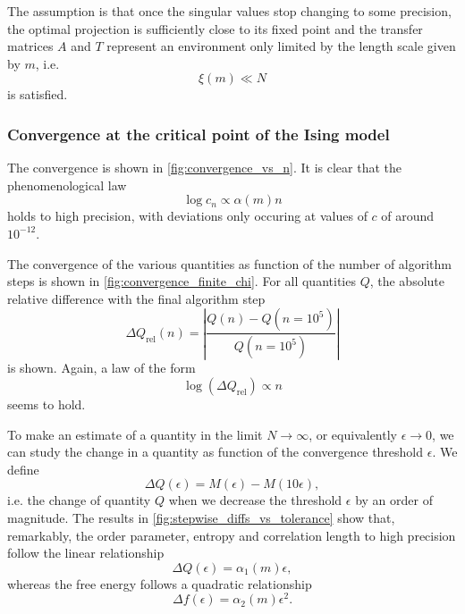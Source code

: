 The assumption is that once the singular values stop changing to some precision, the optimal projection is sufficiently
close to its fixed point and the transfer matrices $A$ and $T$ represent an environment only limited by the length scale
given by $m$, i.e.
\begin{equation}
  \xi(m) \ll N
\end{equation}
is satisfied.

\subsubsection{Convergence at the critical point of the Ising model}
The convergence is shown in \autoref{fig:convergence_vs_n}. It is clear that the
phenomenological law
\begin{equation}
  \log c_n \propto \alpha(m) n
\end{equation}
holds to high precision, with deviations only occuring at values of $c$ of around $10^{-12}$.

The convergence of the various quantities as function of the number of algorithm steps is shown in
\autoref{fig:convergence_finite_chi}. For all quantities $Q$, the absolute relative difference
with the final algorithm step
\begin{equation}\label{eq:abs_rel_diff}
  \Delta Q_{\text{rel}}(n) = \left| \frac{Q(n) - Q(n = 10^5)}{Q(n = 10^5)} \right|
\end{equation}
is shown. Again, a law of the form
\begin{equation}
  \log(\Delta Q_{\text{rel}}) \propto n
\end{equation}
seems to hold.

To make an estimate of a quantity in the limit $N \to \infty$, or equivalently $\epsilon \to 0$,
we can study the change in a quantity as function of the convergence threshold $\epsilon$. We define
\begin{equation}\label{eq:stepwise_difference_epsilon}
  \Delta Q(\epsilon) = M(\epsilon) - M(10\epsilon),
\end{equation}
i.e. the change of quantity $Q$ when we decrease the threshold $\epsilon$ by an order of magnitude. The results in
\autoref{fig:stepwise_diffs_vs_tolerance} show that, remarkably, the order parameter, entropy and correlation length
to high precision follow the linear relationship
\begin{equation}
  \Delta Q(\epsilon) = \alpha_1(m) \epsilon,
\end{equation}
whereas the free energy follows a quadratic relationship
\begin{equation}
  \Delta f(\epsilon) = \alpha_2(m) \epsilon^2.
\end{equation}

